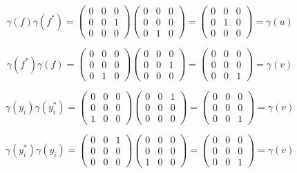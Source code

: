 \begin{solution}
    $$\gamma(f)\gamma(f^*)=\left(\begin{array}{ccc} 0 & 0 & 0 \\ 0 & 0 & 1 \\ 0 & 0 & 0 \end{array}\right)
    \left(\begin{array}{ccc} 0 & 0 & 0 \\ 0 & 0 & 0 \\ 0 & 1 & 0 \end{array}\right)
    =\left(\begin{array}{ccc} 0 & 0 & 0 \\ 0 & 1 & 0 \\ 0 & 0 & 0 \end{array}\right)=\gamma(u)$$

    $$\gamma(f^*)\gamma(f)=\left(\begin{array}{ccc} 0 & 0 & 0 \\ 0 & 0 & 0 \\ 0 & 1 & 0 \end{array}\right)
    \left(\begin{array}{ccc} 0 & 0 & 0 \\ 0 & 0 & 1 \\ 0 & 0 & 0 \end{array}\right)
    =\left(\begin{array}{ccc} 0 & 0 & 0 \\ 0 & 0 & 0 \\ 0 & 0 & 1 \end{array}\right)=\gamma(v)$$

    $$\gamma(y_i)\gamma(y_i^*)=\left(\begin{array}{ccc} 0 & 0 & 0 \\ 0 & 0 & 0 \\ 1 & 0 & 0 \end{array}\right)
    \left(\begin{array}{ccc} 0 & 0 & 1 \\ 0 & 0 & 0 \\ 0 & 0 & 0 \end{array}\right)
    =\left(\begin{array}{ccc} 0 & 0 & 0 \\ 0 & 0 & 0 \\ 0 & 0 & 1 \end{array}\right)=\gamma(v)$$

    $$\gamma(y_i^*)\gamma(y_i)=\left(\begin{array}{ccc} 0 & 0 & 1 \\ 0 & 0 & 0 \\ 0 & 0 & 0 \end{array}\right)
    \left(\begin{array}{ccc} 0 & 0 & 0 \\ 0 & 0 & 0 \\ 1 & 0 & 0 \end{array}\right)
    =\left(\begin{array}{ccc} 0 & 0 & 0 \\ 0 & 0 & 0 \\ 0 & 0 & 1 \end{array}\right)=\gamma(v)$$



\end{solution}

